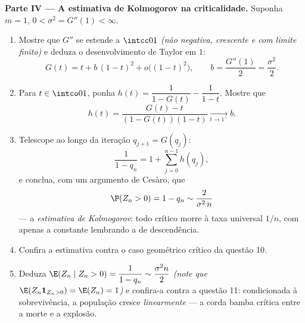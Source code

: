 \begin{problem}
\medskip
\noindent\textbf{Parte IV --- A estimativa de Kolmogorov na
criticalidade.} Suponha $m = 1$, $0 < \sigma^2 = G''(1) <
\infty$.
\begin{enumerate}[resume]
  \item Mostre que $G''$ se estende  a $\intcc01$
        \emph{(não negativa, crescente e com limite finito)} e
        deduza o desenvolvimento de Taylor em $1$:
        \[
        G(t) = t + b\,(1-t)^2 + o\bigl((1-t)^2\bigr),
        \qquad b = \frac{G''(1)}2 = \frac{\sigma^2}2 .
        \]
  \item Para $t \in \intco01$, ponha $h(t) = \dfrac1{1 - G(t)} -
        \dfrac1{1 - t}$. Mostre que
        \[
        h(t) = \frac{G(t) - t}{(1 - G(t))(1 - t)}
        \xrightarrow[t\to1^-]{} b .
        \]
  \item Telescope ao longo da iteração $q_{j+1} = G(q_j)$:
        \[
        \frac1{1 - q_n} = 1 + \sum_{j=0}^{n-1}h(q_j),
        \]
        e conclua, com um argumento de Cesàro, que
        \[
        \P(Z_n > 0) = 1 - q_n \sim \frac{2}{\sigma^2\,n}
        \]
        --- a \emph{estimativa de Kolmogorov}: todo
         crítico morre à taxa universal $1/n$,
        com apenas a constante lembrando a  de descendência.
  \item Confira a estimativa contra o caso geométrico
        crítico da questão 10.
  \item Deduza $\E(Z_n \mid Z_n > 0) = \dfrac{1}{1 - q_n}
        \sim \dfrac{\sigma^2 n}{2}$ \emph{(note que $\E(Z_n
        \mathbf 1_{Z_n>0}) = \E(Z_n) = 1$)} e confira-a
        contra a questão 11: condicionada à sobrevivência, a
        população cresce \emph{linearmente} --- a corda bamba
        crítica entre a morte e a explosão.
\end{enumerate}


\end{problem}
